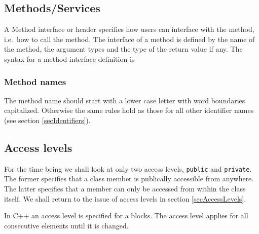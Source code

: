 \noindent {\small }



\subsection{Methods/Services}

A Method interface or header specifies how users can interface with the method,
i.e.\ how to call the method. The interface of a method
is defined by the name of the method, the argument types and the type of
the return value if any. The syntax for a method interface definition is



\subsubsection{Method names}

The method name should start with a lower case letter with word boundaries 
capitalized. Otherwise the same rules hold as those for all other identifier
names (see section \ref{secIdentifiers}).


\subsection{Access levels}

For the time being we shall look at only two access levels, \verb+public+
and \verb+private+. The former specifies that a class member is publically
accessible from anywhere. The latter specifies that a member can only be 
accessed from within the class itself. We shall return to the issue of
access levels in section \ref{secAccessLevels}.

In C++ an access level is specified for a blocks. The access level applies
for all consecutive elements until it is changed.


